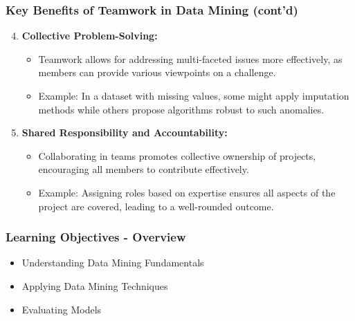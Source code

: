 \documentclass[aspectratio=169]{beamer}
\begin{document}
\begin{frame}[fragile]
    \frametitle{Key Benefits of Teamwork in Data Mining (cont'd)}
    \begin{enumerate}
        \setcounter{enumi}{3}
        \item \textbf{Collective Problem-Solving:}
            \begin{itemize}
                \item Teamwork allows for addressing multi-faceted issues more effectively, as members can provide various viewpoints on a challenge.
                \item Example: In a dataset with missing values, some might apply imputation methods while others propose algorithms robust to such anomalies.
            \end{itemize}

        \item \textbf{Shared Responsibility and Accountability:}
            \begin{itemize}
                \item Collaborating in teams promotes collective ownership of projects, encouraging all members to contribute effectively.
                \item Example: Assigning roles based on expertise ensures all aspects of the project are covered, leading to a well-rounded outcome.
            \end{itemize}
    \end{enumerate}
\end{frame}

\begin{frame}[fragile]
    \frametitle{Learning Objectives - Overview}
    \begin{itemize}
        \item Understanding Data Mining Fundamentals
        \item Applying Data Mining Techniques
        \item Evaluating Models
    \end{itemize}
\end{frame}
\end{document}
